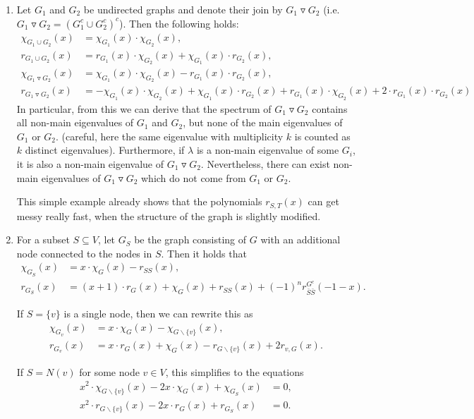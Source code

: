 \documentclass[a4paper,12pt]{article}
\begin{document}
\begin{enumerate}
\item 
Let $G_1$ and $G_2$ be undirected graphs and denote their join by $G_1 \triangledown G_2$ (i.e. $G_1 \triangledown G_2 = \left(G_1^c \cup G_2^c\right)^c$). Then the following holds:
\begin{align*}
\chi_{G_1\cup G_2}(x) &= \chi_{G_1}(x) \cdot \chi_{G_2}(x),\\
r_{G_1\cup G_2}(x) &= r_{G_1}(x)\cdot\chi_{G_2}(x) + \chi_{G_1}(x)\cdot r_{G_2}(x),\\
\chi_{G_1 \triangledown G_2}(x) &= \chi_{G_1}(x) \cdot \chi_{G_2}(x) - r_{G_1}(x)\cdot r_{G_2}(x),\\
r_{G_1 \triangledown G_2}(x) &= -\chi_{G_1}(x)\cdot \chi_{G_2}(x)+\chi_{G_1}(x)\cdot r_{G_2}(x) + r_{G_1}(x)\cdot\chi_{G_2}(x) + 2\cdot r_{G_1}(x) \cdot r_{G_2}(x)
\end{align*}
In particular, from this we can derive that the spectrum of $G_1 \triangledown G_2$ contains all non-main eigenvalues of $G_1$ and $G_2$, but none of the main eigenvalues of $G_1$ or $G_2$. (careful, here the same eigenvalue with multiplicity $k$ is counted as $k$ distinct eigenvalues). Furthermore, if $\lambda$ is a non-main eigenvalue of some $G_i$, it is also a non-main eigenvalue of $G_1 \triangledown G_2$. Nevertheless, there can exist non-main eigenvalues of $G_1 \triangledown G_2$ which do not come from $G_1$ or $G_2$.

This simple example already shows that the polynomials $r_{S,T}(x)$ can get messy really fast, when the structure of the graph is slightly modified.

\item 
For a subset $S \subseteq V$, let $G_S$ be the graph consisting of $G$ with an additional node connected to the nodes in $S$. Then it holds that
\begin{align*}
\chi_{G_S}(x) &= x\cdot \chi_G(x) - r_{SS}(x),\\
r_{G_S}(x) &= (x+1)\cdot r_G(x) + \chi_G(x) + r_{SS}(x) + (-1)^nr_{\bar{S}\bar{S}}^{G^c}(-1-x).
\end{align*}

If $S = \{v\}$ is a single node, then we can rewrite this as
\begin{align*}
\chi_{G_v}(x) &= x \cdot\chi_G(x)-\chi_{G\backslash\{v\}}(x),\\
r_{G_v}(x) &= x \cdot r_G(x) + \chi_G(x) - r_{G\backslash\{v\}}(x)+2r_{v,G}(x).
\end{align*}

If $S = N(v)$ for some node $v\in V$, this simplifies to the equations
\begin{align*}
x^2\cdot\chi_{G\backslash\{v\}}(x) - 2x\cdot\chi_G(x) + \chi_{G_S}(x) &= 0,\\
x^2\cdot r_{G\backslash\{v\}}(x) - 2x\cdot r_G(x) + r_{G_S}(x) &= 0.
\end{align*}


\end{enumerate}
\end{document}
